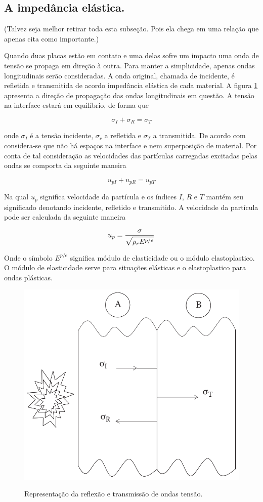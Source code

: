  
 \subsection{A impedância elástica.} (Talvez seja melhor retirar toda esta subseção. Pois ela chega em uma relação que apenas \cite{Hazell} cita como importante.)
 
 Quando duas placas estão em contato e uma delas sofre um impacto uma onda de tensão se propaga em direção à outra. Para manter a simplicidade, apenas ondas longitudinais serão consideradas. A onda original, chamada de incidente, é refletida e transmitida de acordo impedância elástica de cada material. A figura \ref{fig:ondasincierefle} apresenta  a direção de propagação das ondas longitudinais em questão. A tensão na interface estará em equilíbrio, de forma que
 
 \begin{equation} \label{eq:equitensao}
     \sigma_I + \sigma_R = \sigma_T
 \end{equation}
 
 onde  $ \sigma_I $ é a tensão incidente, $ \sigma_r $ a refletida e $ \sigma_T $ a transmitida. De acordo com \cite{Hazell} considera-se que não há espaços na interface e nem superposição de material. Por conta de tal consideração  as velocidades das partículas carregadas excitadas pelas ondas se comporta da seguinte maneira
 
 \begin{equation} \label{eq:equivel}
     u_{pI} + u_{pR} = u_{pT}
 \end{equation}
 
 Na qual $u_{p}$ significa velocidade da partícula e os  índices $I$, $R$ e $T$ mantém seu significado denotando incidente, refletido e transmitido. A velocidade da partícula pode ser calculada da seguinte maneira
 
 \begin{equation} \label{eq:calculodavel}
     u_p = \frac{\displaystyle \sigma}{\displaystyle \sqrt{\rho_r E^{p/e}}}
 \end{equation}

Onde o símbolo $ E^{p/e} $ significa módulo de elasticidade ou o módulo elastoplastico. O módulo de elasticidade serve para situações elásticas e o elastoplastico para ondas plásticas.\\
 
 \begin{figure}[H]
     \centering
     \caption{Representação da reflexão e transmissão de ondas tensão.}
     \includegraphics[width=0.5 \linewidth]{images/ondasincirefle.png}
     \label{fig:ondasincierefle}
 \end{figure}
 
